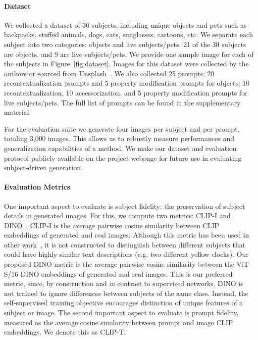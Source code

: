 \paragraph{Dataset}
We collected a dataset of 30 subjects, including unique objects and pets such as backpacks, stuffed animals, dogs, cats, sunglasses, cartoons, etc. We separate each subject into two categories: objects and live subjects/pets. 21 of the 30 subjects are objects, and 9 are live subjects/pets. We provide one sample image for each of the subjects in Figure~\ref{fig:dataset}. Images for this dataset were collected by the authors or sourced from Unsplash~\cite{unsplash}. We also collected 25 prompts: 20 recontextualization prompts and 5 property modification prompts for objects; 10 recontextualization, 10 accessorization, and 5 property modification prompts for live subjects/pets. The full list of prompts can be found in the supplementary material.

For the evaluation suite we generate four images per subject and per prompt, totaling 3,000 images. This allows us to robustly measure performances and generalization capabilities of a method. We make our dataset and evaluation protocol publicly available on the project webpage for future use in evaluating subject-driven generation.

\paragraph{Evaluation Metrics} One important aspect to evaluate is subject fidelity: the preservation of subject details in generated images. For this, we compute two metrics: CLIP-I and DINO~\cite{caron2021emerging}. CLIP-I is the average pairwise cosine similarity between CLIP~\cite{radford2021learning} embeddings of generated and real images. Although this metric has been used in other work~\cite{gal2022image}, it is not constructed to distinguish between different subjects that could have highly similar text descriptions (e.g. two different yellow clocks). Our proposed DINO metric is the average pairwise cosine similarity between the ViT-S/16 DINO embeddings of generated and real images. This is our preferred metric, since, by construction and in contrast to supervised networks, DINO is not trained to ignore differences between subjects of the same class. Instead, the self-supervised training objective encourages distinction of unique features of a subject or image. The second important aspect to evaluate is prompt fidelity, measured as the average cosine similarity between prompt and image CLIP embeddings. We denote this as CLIP-T.

